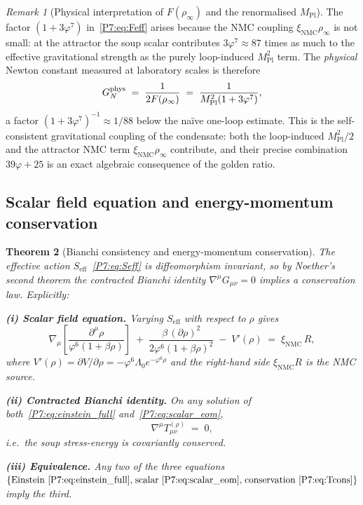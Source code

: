 \documentclass[11pt,a4paper]{article}
\newtheorem{theorem}{Theorem}[section]
\theoremstyle{definition}
\theoremstyle{remark}
\newtheorem{remark}[theorem]{Remark}
\newcommand{\vp}{\varphi}
\newcommand{\MPl}{M_{\mathrm{Pl}}}
\newcommand{\rinfty}{\rho_{\infty}}
\newcommand{\xNMC}{\xi_{\mathrm{NMC}}}
\begin{document}
\begin{remark}[Physical interpretation of $F(\rinfty)$ and the renormalised $\MPl$]
\label{P7:rem:MPl_renorm}
The factor $(1+3\vp^7)$ in~\eqref{P7:eq:Feff} arises because the NMC coupling
$\xNMC\rho_\infty$ is not small: at the attractor the soup scalar contributes
$3\vp^7\approx87$ times as much to the effective gravitational strength as the
purely loop-induced $\MPl^2$ term.
The \emph{physical} Newton constant measured at laboratory scales is therefore
\begin{equation}
  G_N^{\rm phys}
  \;=\; \frac{1}{2F(\rinfty)}
  \;=\; \frac{1}{\MPl^2(1+3\vp^7)},
  \label{P7:eq:GN_phys}
\end{equation}
a factor $(1+3\vp^7)^{-1}\approx1/88$ below the na\"ive one-loop estimate.
This is the self-consistent gravitational coupling of the condensate: both the
loop-induced $\MPl^2/2$ and the attractor NMC term $\xNMC\rinfty$ contribute,
and their precise combination $39\vp+25$ is an exact algebraic consequence of
the golden ratio.
\end{remark}

\subsection{Scalar field equation and energy-momentum conservation}
\label{P7:sec:conservation}

\begin{theorem}[Bianchi consistency and energy-momentum conservation]
\label{P7:thm:conservation}
The effective action $S_{\mathrm{eff}}$~\eqref{P7:eq:Seff} is diffeomorphism
invariant, so by Noether's second theorem the contracted Bianchi identity
$\nabla^\mu G_{\mu\nu}=0$ implies a conservation law.
Explicitly:

\noindent\textbf{(i) Scalar field equation.}
Varying $S_{\mathrm{eff}}$ with respect to $\rho$ gives
\begin{equation}
  \nabla_\mu\!\left[\frac{\partial^\mu\rho}{\vp^6(1+\beta\rho)}\right]
  \;+\; \frac{\beta\,(\partial\rho)^2}{2\vp^6(1+\beta\rho)^2}
  \;-\; V'(\rho)
  \;=\; \xNMC\,R,
  \label{P7:eq:scalar_eom}
\end{equation}
where $V'(\rho)=\partial V/\partial\rho=-\vp^6\Lambda_0 e^{-\vp^6\rho}$
and the right-hand side $\xNMC R$ is the NMC source.

\noindent\textbf{(ii) Contracted Bianchi identity.}
On any solution of both~\eqref{P7:eq:einstein_full} and~\eqref{P7:eq:scalar_eom},
\begin{equation}
  \nabla^\mu T_{\mu\nu}^{(\rho)} \;=\; 0,
  \label{P7:eq:Tcons}
\end{equation}
i.e.\ the soup stress-energy is covariantly conserved.

\noindent\textbf{(iii) Equivalence.}
Any two of the three equations
$\{\text{Einstein~\eqref{P7:eq:einstein_full},\;scalar~\eqref{P7:eq:scalar_eom},\;conservation~\eqref{P7:eq:Tcons}}\}$
imply the third.
\end{theorem}
\end{document}
